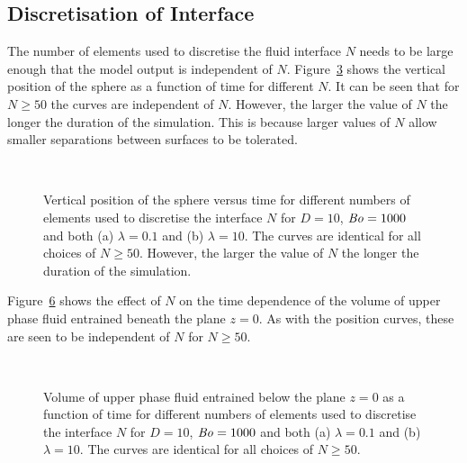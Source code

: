 \documentclass[12pt]{article}
\newcommand\Bo{\mbox{\textit{Bo}}}  %
\begin{document}
\subsection{Discretisation of Interface}
\label{subsec:interf}

The number of elements used to discretise the fluid interface $N$ needs to be large enough that the model output is independent of $N$. Figure~\ref{fig:n_interf_test_pos} shows the vertical position of the sphere as a function of time for different $N$. It can be seen that for $N \geq 50$ the curves are independent of $N$. However, the larger the value of $N$ the longer the duration of the simulation. This is because larger values of $N$ allow smaller separations between surfaces to be tolerated. 

    \begin{figure}
      \centering
      \begin{subfigure}[b]{0.5\textwidth}
        \resizebox{\textwidth}{!}{\Large }
        \caption{}
        \label{fig:n_interf_test_pos_tail}
      \end{subfigure}%
      ~
      \begin{subfigure}[b]{0.5\textwidth}
        \resizebox{\textwidth}{!}{\Large }
        \caption{}
        \label{fig:n_interf_test_pos_film}
      \end{subfigure}
      \caption{Vertical position of the sphere versus time for different numbers of elements used to discretise the interface $N$ for $D = 10$, $\Bo = 1000$ and both (a) $\lambda = 0.1$ and (b) $\lambda = 10$. The curves are identical for all choices of $N \geq 50$. However, the larger the value of $N$ the longer the duration of the simulation.}\label{fig:n_interf_test_pos}
    \end{figure}

Figure~\ref{fig:n_interf_test_vol} shows the effect of $N$ on the time dependence of the volume of upper phase fluid entrained beneath the plane $z = 0$. As with the position curves, these are seen to be independent of $N$ for $N \geq 50$.

    \begin{figure}
      \centering
      \begin{subfigure}[b]{0.5\textwidth}
        \resizebox{\textwidth}{!}{\Large }
        \caption{}
        \label{fig:n_interf_test_vol_tail}
      \end{subfigure}%
      ~
      \begin{subfigure}[b]{0.5\textwidth}
        \resizebox{\textwidth}{!}{\Large }
        \caption{}
        \label{fig:n_interf_test_vol_film}
      \end{subfigure}
      \caption{Volume of upper phase fluid entrained below the plane $z = 0$ as a function of time for different numbers of elements used to discretise the interface $N$ for $D = 10$, $\Bo = 1000$ and both (a) $\lambda = 0.1$ and (b) $\lambda = 10$. The curves are identical for all choices of $N \geq 50$.}\label{fig:n_interf_test_vol}
    \end{figure}
\end{document}
